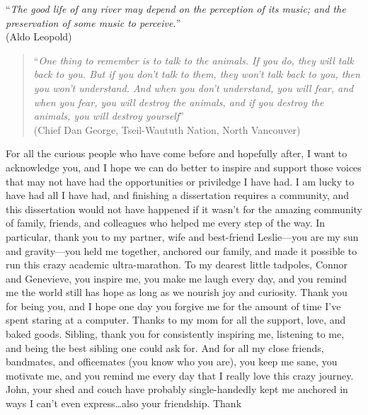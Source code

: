 \documentclass[twoside,12pt,final]{ucthesis-CA2012} %
\begin{document}
\begin{ucfrontmatter}
\begin{dedication}
\begin{center}
\begin{large}
        ``\emph{The good life of any river may depend on the perception of its
        music; and the preservation of some music to perceive.}''\\
        (Aldo Leopold)
        \begin{quote}
        ``\emph{One thing to remember is to talk to the animals. If you do, they
        will talk back to you. But if you don't talk to them, they won't talk
        back to you, then you won't understand. And when you don't understand,
        you will fear, and when you fear, you will destroy the animals, and if
        you destroy the animals, you will destroy yourself}''\\
        (Chief Dan George, Tseil-Waututh Nation, North Vancouver)
        \end{quote}
      \end{large}
      \end{center}
  \end{dedication}
  \begin{acknowledgements}
    For all the curious people who have come before and hopefully after, I
    want to acknowledge you, and I hope we can do better to inspire and
    support those voices that may not have had the opportunities or
    priviledge I have had. I am lucky to have had all I have had, and
    finishing a dissertation requires a community, and this dissertation
    would not have happened if it wasn't for the amazing community of
    family, friends, and colleagues who helped me every step of the way. In
    particular, thank you to my partner, wife and best-friend Leslie---you
    are my sun and gravity---you held me together, anchored our family, and
    made it possible to run this crazy academic ultra-marathon. To my
    dearest little tadpoles, Connor and Genevieve, you inspire me, you make
    me laugh every day, and you remind me the world still has hope as long
    as we nourish joy and curiosity. Thank you for being you, and I hope one
    day you forgive me for the amount of time I've spent staring at a
    computer. Thanks to my mom for all the support, love, and baked goods.
    Sibling, thank you for consistently inspiring me, listening to me, and
    being the best sibling one could ask for. And for all my close friends,
    bandmates, and officemates (you know who you are), you keep me sane, you
    motivate me, and you remind me every day that I really love this crazy
    journey. John, your shed and couch have probably single-handedly kept me
    anchored in ways I can't even express\ldots{}also your friendship. Thank

\end{acknowledgements}
\end{ucfrontmatter}
\end{document}
